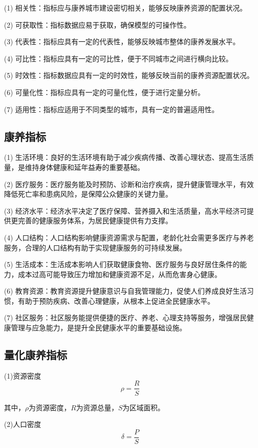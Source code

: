 \documentclass[12pt,a4paper]{article}
\begin{document}
(1) 相关性：指标应与康养城市建设密切相关，能够反映康养资源的配置状况。

(2) 可获取性：指标数据应易于获取，确保模型的可操作性。

(3) 代表性：指标应具有一定的代表性，能够反映城市整体的康养发展水平。

(4) 可比性：指标应具有一定的可比性，便于不同城市之间进行横向比较。

(5) 时效性：指标数据应具有一定的时效性，能够反映当前的康养资源配置状况。

(6) 可量化性：指标应具有一定的可量化性，便于进行定量分析。

(7) 适用性：指标应适用于不同类型的城市，具有一定的普遍适用性。

\subsection{康养指标}

(1) 生活环境：良好的生活环境有助于减少疾病传播、改善心理状态、提高生活质量，是维持身体健康和延年益寿的重要基础。

(2) 医疗服务：医疗服务能及时预防、诊断和治疗疾病，提升健康管理水平，有效降低死亡率和患病风险，是保障公众健康的关键力量。

(3) 经济水平：经济水平决定了医疗保障、营养摄入和生活质量，高水平经济可提供更完善的健康服务体系，为居民健康提供有力支撑。

(4) 人口结构：人口结构影响健康资源需求与配置，老龄化社会需更多医疗与养老服务，合理的人口结构有助于实现健康服务的可持续发展。

(5) 生活成本：生活成本影响人们获取健康食物、医疗服务与良好居住条件的能力，成本过高可能导致压力增加和健康资源不足，从而危害身心健康。

(6) 教育资源：教育资源提升健康意识与自我管理能力，促使人们养成良好生活习惯，有助于预防疾病、改善心理健康，从根本上促进全民健康水平。

(7) 社区服务：社区服务能提供便捷的医疗、养老、心理支持等服务，增强居民健康管理与应急能力，是提升全民健康水平的重要基础设施。

\subsection{量化康养指标}

(1)资源密度
\[
\rho = \frac{R}{S}
\]

其中，$\rho$为资源密度，$R$为资源总量，$S$为区域面积。

(2)人口密度
\[
\delta = \frac{P}{S}
\]
\end{document}
